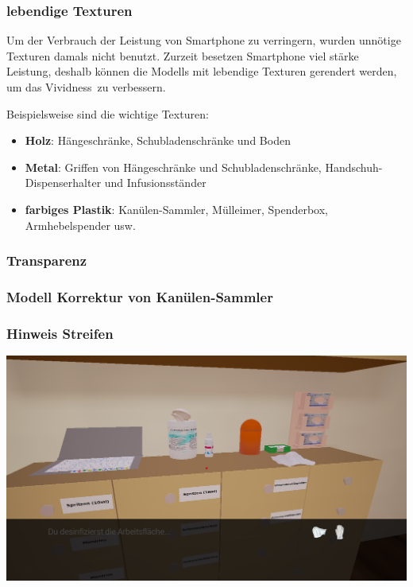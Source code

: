    \subsubsection{lebendige Texturen}
   
   Um der Verbrauch der Leistung von Smartphone zu verringern, wurden unnötige Texturen damals nicht benutzt. Zurzeit besetzen Smartphone viel stärke Leistung, deshalb können die Modells mit lebendige Texturen gerendert werden, um das \glqq Vividness\grqq\ zu verbessern.
   
   Beispielsweise sind die wichtige Texturen:
   \begin{itemize}
       \item \textbf{Holz}: Hängeschränke, Schubladenschränke und Boden
       \item \textbf{Metal}: Griffen von Hängeschränke und Schubladenschränke, Handschuh-Dispenserhalter und Infusionsständer
       \item \textbf{farbiges Plastik}: Kanülen-Sammler,  Mülleimer, Spenderbox, Armhebelspender usw.
   \end{itemize}
   
   \subsubsection{Transparenz}
   
   \subsubsection{Modell Korrektur von Kanülen-Sammler}
   
   \subsubsection{Hinweis Streifen}
   
   \includegraphics[width=\textwidth]{images/Schritt_4_2.png}

